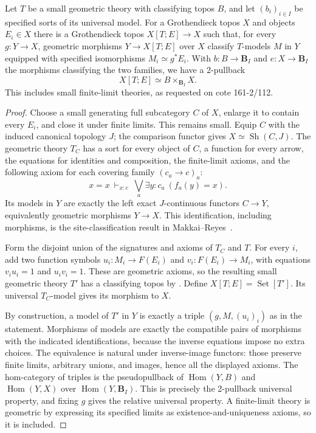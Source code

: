 \begin{theorem}\label{cat:I6}
Let $T$ be a small geometric theory with classifying topos $B$, and
let $(b_i)_{i\in I}$ be specified sorts of its universal model.
For a Grothendieck topos $X$ and objects $E_i\in X$ there is a
Grothendieck topos $X[T;E]\to X$ such that, for every
$g:Y\to X$, geometric morphisms $Y\to X[T;E]$ over $X$ classify
$T$-models $M$ in $Y$ equipped with specified isomorphisms
$M_i\simeq g^*E_i$.
With $b:B\to\mathbf B_I$ and $e:X\to\mathbf B_I$ the morphisms
classifying the two families, we have a 2-pullback
\[
 X[T;E]\simeq B\times_{\mathbf B_I}X.
\]
This includes small finite-limit theories, as requested on
cote 161-2/112.
\end{theorem}
\begin{proof}
Choose a small generating full subcategory $C$ of $X$, enlarge it to
contain every $E_i$, and close it under finite limits.  This remains
small.  Equip $C$ with the induced canonical topology $J$; the
comparison functor gives $X\simeq\operatorname{Sh}(C,J)$.
The geometric theory $T_C$ has a sort for every object of $C$, a
function for every arrow, the equations for identities and composition,
the finite-limit axioms, and the following axiom for each covering
family $(c_a\to c)_a$:
\[
 x=x\ \vdash_{x:c}\ \bigvee_a\exists y:c_a\ (f_a(y)=x).
\]
Its models in $Y$ are exactly the left exact $J$-continuous functors
$C\to Y$, equivalently geometric morphisms $Y\to X$.
This identification, including morphisms, is the site-classification
result in Makkai--Reyes~\cite[Propositions 9.1.4--9.1.5]{catMakkaiReyes1977}.

Form the disjoint union of the signatures and axioms of $T_C$ and
$T$.  For every $i$, add two function symbols
$u_i:M_i\to F(E_i)$ and $v_i:F(E_i)\to M_i$, with equations
$v_i u_i=1$ and $u_i v_i=1$.  These are geometric axioms, so the
resulting small geometric theory $T'$ has a classifying topos by
\cite[Theorem 9.1.1]{catMakkaiReyes1977}.  Define
$X[T;E]=\operatorname{Set}[T']$.  Its universal $T_C$-model gives
its morphism to $X$.

By construction, a model of $T'$ in $Y$ is exactly a triple
$(g,M,(u_i)_i)$ as in the statement.  Morphisms of models are
exactly the compatible pairs of morphisms with the indicated
identifications, because the inverse equations impose no extra choices.
The equivalence is natural under inverse-image functors: those preserve
finite limits, arbitrary unions, and images, hence all the displayed
axioms.  The hom-category of triples is the pseudopullback of
$\operatorname{Hom}(Y,B)$ and $\operatorname{Hom}(Y,X)$ over
$\operatorname{Hom}(Y,\mathbf B_I)$.  This is precisely the
2-pullback universal property, and fixing $g$ gives the relative
universal property.  A finite-limit theory is geometric by expressing
its specified limits as existence-and-uniqueness axioms, so it is
included.
\end{proof}
